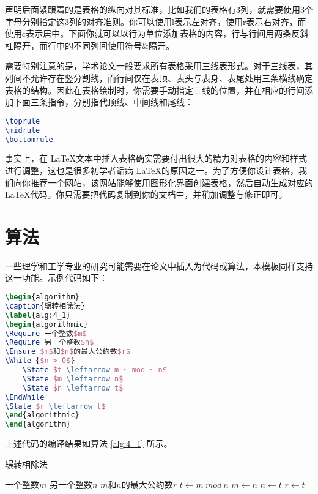 声明后面紧跟着的是表格的纵向对其标准，比如我们的表格有3列，就需要使用3个字母分别指定这3列的对齐准则。你可以使用{\codefont l}表示左对齐，使用{\codefont r}表示右对齐，而使用{\codefont c}表示居中。下面你就可以以行为单位添加表格的内容，行与行间用两条反斜杠隔开，而行中的不同列间使用符号\&隔开。

需要特别注意的是，学术论文一般要求所有表格采用三线表形式。对于三线表，其列间不允许存在竖分割线，而行间仅在表顶、表头与表身、表尾处用三条横线确定表格的结构。因此在表格绘制时，你需要手动指定三线的位置，并在相应的行间添加下面三条指令，分别指代顶线、中间线和尾线：

\begin{tcolorbox}
\begin{lstlisting}[language=TeX]
\toprule
\midrule
\bottomrule
\end{lstlisting}
\end{tcolorbox}

事实上，在 \LaTeX 文本中插入表格确实需要付出很大的精力对表格的内容和样式进行调整，这也是很多初学者诟病 \LaTeX 的原因之一。为了方便你设计表格，我们向你推荐\href{http://www.tablesgenerator.com/}{一个网站}，该网站能够使用图形化界面创建表格，然后自动生成对应的 \LaTeX 代码。你只需要把代码复制到你的文档中，并稍加调整与修正即可。

\section{算法}

一些理学和工学专业的研究可能需要在论文中插入为代码或算法，本模板同样支持这一功能。示例代码如下：

\begin{tcolorbox}
\begin{lstlisting}[language=TeX]
\begin{algorithm}
\caption{辗转相除法}
\label{alg:4_1}
\begin{algorithmic}
\Require 一个整数$m$
\Require 另一个整数$n$
\Ensure $m$和$n$的最大公约数$r$
\While {$n > 0$}
    \State $t \leftarrow m ~ mod ~ n$
    \State $m \leftarrow n$
    \State $n \leftarrow t$
\EndWhile
\State $r \leftarrow t$
\end{algorithmic}
\end{algorithm}
\end{lstlisting}
\end{tcolorbox}

\noindent 上述代码的编译结果如算法 \ref{alg:4_1} 所示。

\begin{algorithm}
\caption{辗转相除法}
\label{alg:4_1}
\begin{algorithmic}
\Require 一个整数$m$
\Require 另一个整数$n$
\Ensure $m$和$n$的最大公约数$r$
    \State $t \leftarrow m ~ mod ~ n$
    \State $m \leftarrow n$
    \State $n \leftarrow t$
\EndWhile
\State $r \leftarrow t$
\end{algorithmic}
\end{algorithm}

